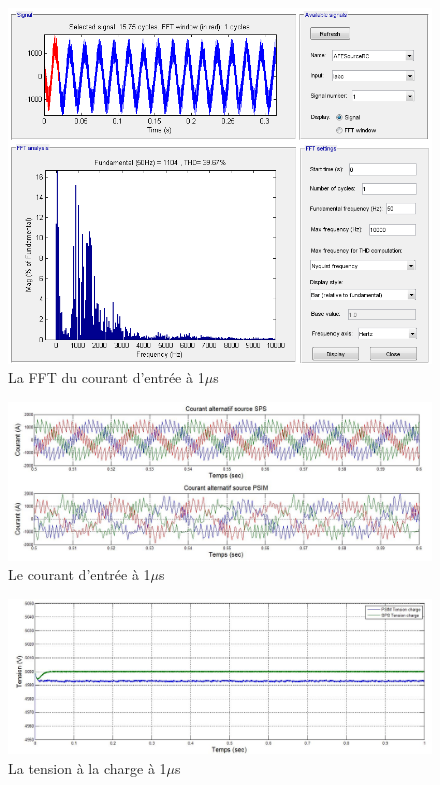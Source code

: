 \documentclass[11pt,letterpaper,final]{report}
\begin{document}
\begin{figure}[htb]
\centering
\includegraphics[scale=0.5]{Fig/AFERC/FFTAnalysisToolResult5u.png}
\caption{La FFT du courant d'entrée à 1$\mu$s}
\label{fft_RC}
\end{figure}

\begin{figure}[htb]
\centering
\includegraphics[scale=0.5]{Fig/AFERC/cour_al.jpg}
\caption{Le courant d'entrée à 1$\mu$s}
\label{AF_RC_cou}
\end{figure}

\begin{figure}[htb]
\centering
\includegraphics[scale=0.5]{Fig/AFERC/vch.jpg}
\caption{La tension à la charge à 1$\mu$s}
\label{AF_RC_ten}
\end{figure}
\end{document}
